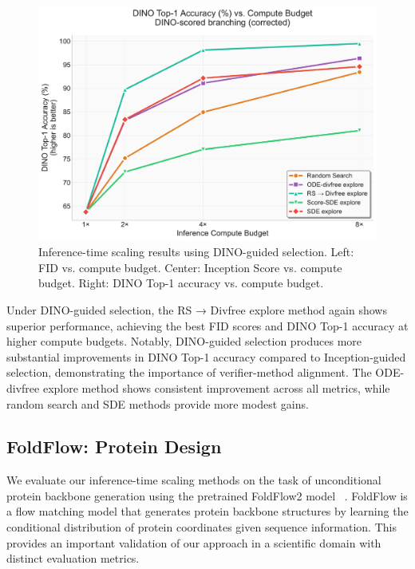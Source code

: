 \documentclass{article}
\begin{document}
\begin{figure}[H]
\begin{minipage}{0.32\textwidth}
  \end{minipage}
  \hfill
  \begin{minipage}{0.32\textwidth}
    \centering
    \includegraphics[width=\textwidth]{figures/scaling_dino_top1.pdf}
  \end{minipage}
  \caption{Inference-time scaling results using DINO-guided selection. Left: FID vs. compute budget. Center: Inception Score vs. compute budget. Right: DINO Top-1 accuracy vs. compute budget.}
  \label{fig:dino-scaling}
\end{figure}

Under DINO-guided selection, the RS → Divfree explore method again shows superior performance, achieving the best FID scores and DINO Top-1 accuracy at higher compute budgets. Notably, DINO-guided selection produces more substantial improvements in DINO Top-1 accuracy compared to Inception-guided selection, demonstrating the importance of verifier-method alignment. The ODE-divfree explore method shows consistent improvement across all metrics, while random search and SDE methods provide more modest gains.

\subsection{FoldFlow: Protein Design}

We evaluate our inference-time scaling methods on the task of unconditional protein backbone generation using the pretrained FoldFlow2 model~\cite{foldflow2} . FoldFlow is a flow matching model that generates protein backbone structures by learning the conditional distribution of protein coordinates given sequence information. This provides an important validation of our approach in a scientific domain with distinct evaluation metrics.
\end{document}
